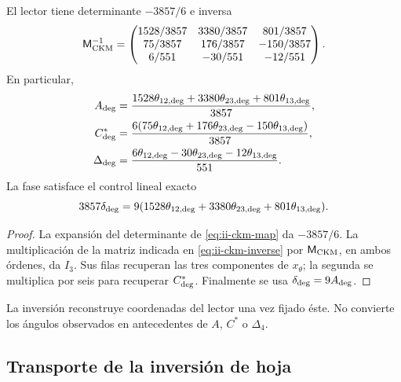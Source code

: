 \begin{proposition}
El lector tiene determinante \(-3857/6\) e inversa
\begin{equation}
 \mathsf M_{\rm CKM}^{-1}=
 \begin{pmatrix}
 1528/3857&3380/3857&801/3857\\
 75/3857&176/3857&-150/3857\\
 6/551&-30/551&-12/551
 \end{pmatrix}.
 \label{eq:ii-ckm-inverse}
\end{equation}
En particular,
\begin{align}
 A_{\rm deg}
 &=\frac{1528\theta_{12,\rm deg}+3380\theta_{23,\rm deg}
          +801\theta_{13,\rm deg}}{3857},\nonumber\\
 C^*_{\rm deg}
 &=\frac{6(75\theta_{12,\rm deg}+176\theta_{23,\rm deg}
          -150\theta_{13,\rm deg})}{3857},\nonumber\\
 \Delta_{\rm deg}
 &=\frac{6\theta_{12,\rm deg}-30\theta_{23,\rm deg}
          -12\theta_{13,\rm deg}}{551}.
 \label{eq:ii-ckm-recover}
\end{align}
La fase satisface el control lineal exacto
\begin{equation}
 3857\delta_{\rm deg}
 =9(1528\theta_{12,\rm deg}+3380\theta_{23,\rm deg}
      +801\theta_{13,\rm deg}).
 \label{eq:ii-ckm-phase-check}
\end{equation}
\end{proposition}

\begin{proof}
La expansión del determinante de \eqref{eq:ii-ckm-map} da
\(-3857/6\). La multiplicación de la matriz indicada en
\eqref{eq:ii-ckm-inverse} por \(\mathsf M_{\rm CKM}\), en ambos
órdenes, da \(I_3\). Sus filas recuperan las tres componentes de
\(x_\theta\); la segunda se multiplica por seis para recuperar
\(C^*_{\rm deg}\). Finalmente se usa
\(\delta_{\rm deg}=9A_{\rm deg}\).
\end{proof}

La inversión reconstruye coordenadas del lector una vez fijado éste. No
convierte los ángulos observados en antecedentes de \(A\), \(C^*\) o
\(\Delta_4\).



\subsection{Transporte de la inversión de hoja}

